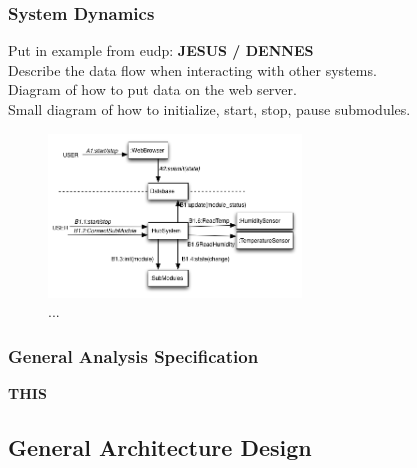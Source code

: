 	\subsubsection{System Dynamics}
			Put in example from eudp: %
			 \textbf{JESUS / DENNES}
			\\Describe the data flow when interacting with other systems.
			\\Diagram of how to put data on the web server.
			\\Small diagram of how to initialize, start, stop, pause submodules.
			\begin{figure}[h!]		%
			\begin{centering}
				 \includegraphics[width=0.6\textwidth]{images/communication_diagram.png}
				\caption{...}
		 	\end{centering}
		\end{figure}		
	\subsubsection{General Analysis Specification}
		 \textbf{THIS}
\subsection{General Architecture Design}
